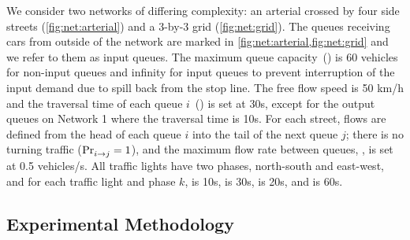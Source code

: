 We consider two networks of differing complexity: an arterial crossed by four
side streets (\cref{fig:net:arterial}) and a 3-by-3 grid (\cref{fig:net:grid}).
%
The queues receiving cars from outside of the network are
marked in \cref{fig:net:arterial,fig:net:grid} and we refer to them as input queues.
%
The maximum queue capacity~() is 60 vehicles for non-input queues and
infinity for input queues to prevent interruption of the input demand due to
spill back from the stop line. 
%
The free flow speed is 50 km/h and the traversal time of each queue $i$~() is set at 30s,
except for the output queues on Network 1 where the traversal
time is 10s.
%
For each street, flows are defined from the head of each queue $i$ into the tail
of the next queue $j$;
%
there is no turning traffic ($\mathrm{Pr}_{i\to j}^{\mathrm{}}=1$), and the maximum flow rate
between queues, , is set at 0.5 vehicles/s.
%
All traffic lights have two phases, north-south and east-west, and for each
traffic light \tl and phase $k$,  is 10s,  is 30s,
\CTMIN{\tl} is 20s, and \CTMAX{\tl} is 60s.



%
% 
%


\subsection{Experimental Methodology}






